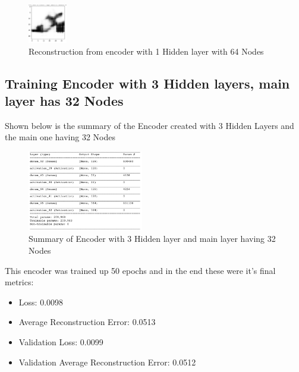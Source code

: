 \documentclass[conference]{IEEEtran}
\begin{document}
    \begin{figure}[H]
        \centering
        \captionsetup{justification=centering}
        \centering
            \includegraphics[width=0.15\textwidth]{11.png}
            \caption{Reconstruction from encoder with 1 Hidden layer with 64 Nodes}
    \end{figure}



    \subsection{Training Encoder with 3 Hidden layers, main layer has 32 Nodes}

    Shown below is the summary of the Encoder created with 3 Hidden Layers and the main one having 32 Nodes

    \begin{figure}[H]
        \centering
        \captionsetup{justification=centering}
        \centering
            \includegraphics[width=0.45\textwidth]{12.png}
            \caption{Summary of Encoder with 3 Hidden layer and main layer having 32 Nodes}
    \end{figure}

    This encoder was trained up 50 epochs and in the end these were it's final metrics:

    \begin{itemize}
        \item Loss: 0.0098
        \item Average Reconstruction Error: 0.0513
        \item Validation Loss: 0.0099
        \item Validation Average Reconstruction Error: 0.0512
    \end{itemize}
\end{document}
